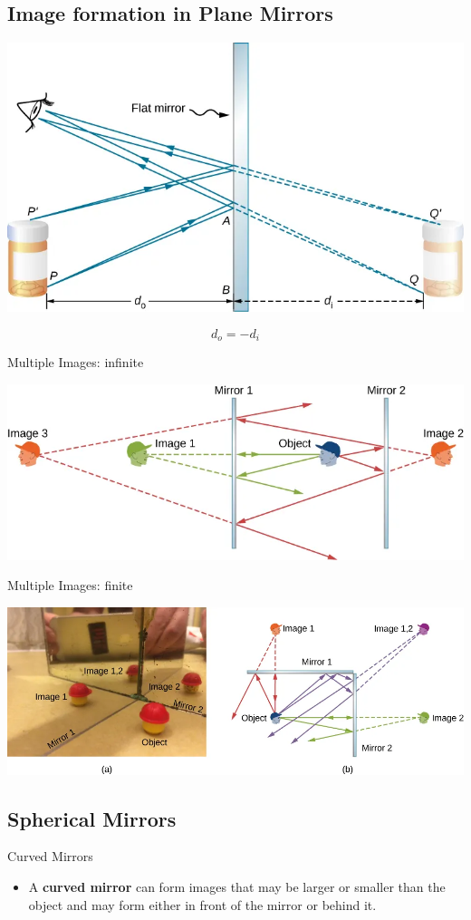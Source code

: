 \documentclass{beamer}
\begin{document}
\subsection{Image formation in Plane Mirrors}
\begin{frame}
	\begin{center}
		\includegraphics[scale=0.3]{37.png}
	\end{center}
	\begin{displaymath}
		d_{o} = -d_{i} 
	\end{displaymath}
\end{frame}
\begin{frame}{Multiple Images: infinite }
	\begin{center}
		\includegraphics[scale=0.4]{38.png}
	\end{center}
\end{frame}
\begin{frame}{Multiple Images: finite }
	\begin{center}
		\includegraphics[scale=0.3]{39.png}
	\end{center}
\end{frame}
\subsection{Spherical Mirrors}
\begin{frame}{Curved Mirrors }
	\begin{itemize}
		\item A \textbf{curved mirror} can form images that may be larger or smaller than the object and may form either in front of the mirror or behind it.
	\end{itemize}
	
\end{frame}
\end{document}
